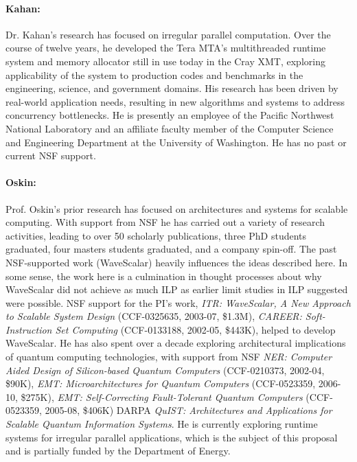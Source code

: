 \paragraph{Kahan:} Dr. Kahan's research has focused on irregular parallel computation.  Over the course of twelve years, he developed the Tera MTA's multithreaded runtime system and memory allocator still in use today in the Cray XMT, exploring applicability of the system to production codes and benchmarks in the engineering, science, and government domains.  His research has been driven by real-world application needs, resulting in new algorithms and systems to address concurrency bottlenecks.  He is presently an employee of the Pacific Northwest National Laboratory and an affiliate faculty member of the Computer Science and Engineering Department at the University of Washington.  He has no past or current NSF support.

\paragraph{Oskin:} Prof. Oskin's prior research has focused on architectures and systems for scalable computing.  With support from NSF he has carried out a variety of research activities, leading to over 50 scholarly publications, three PhD students graduated, four masters students graduated, and a company spin-off.  The past NSF-supported work (WaveScalar) heavily influences the ideas described here. In some sense, the work here is a culmination in thought processes about why WaveScalar did not achieve as much ILP as earlier limit studies in ILP suggested were possible.  NSF support for the PI's work, {\em ITR: WaveScalar, A New Approach to Scalable System Design} (CCF-0325635, 2003-07, \$1.3M), {\em CAREER: Soft-Instruction Set Computing} (CCF-0133188, 2002-05, \$443K), helped to develop WaveScalar.  He has also spent over a decade exploring architectural implications of quantum computing technologies, with support from NSF {\em NER: Computer Aided Design of Silicon-based Quantum Computers} (CCF-0210373, 2002-04, \$90K), {\em EMT: Microarchitectures for Quantum Computers} (CCF-0523359, 2006-10, \$275K), {\em EMT: Self-Correcting Fault-Tolerant Quantum Computers} (CCF-0523359, 2005-08, \$406K) DARPA {\em QuIST: Architectures and Applications for Scalable Quantum Information Systems}.  He is currently exploring runtime systems for irregular parallel applications, which is the subject of this proposal and is partially funded by the Department of Energy.

